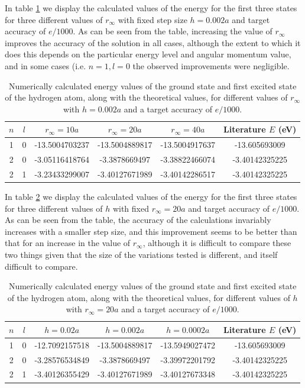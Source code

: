 \documentclass{article}
\begin{document}
In table \ref{tab:2b_ii} we display the calculated values of the energy for the first three states for three different values of $r_\infty$ with fixed step size $h=0.002a$ and target accuracy of $e/1000$. As can be seen from the table, increasing the value of $r_\infty$ improves the accuracy of the solution in all cases, although the extent to which it does this depends on the particular energy level and angular momentum value, and in some cases (i.e. $n=1, l=0$ the observed improvements were negligible.

\begin{table}[H]
	\centering
	\caption{Numerically calculated energy values of the ground state and first excited state of the hydrogen atom, along with the theoretical values, for different values of $r_\infty$ with $h=0.002a$ and a target accuracy of $e/1000$.}
	\label{tab:2b_ii}
	\begin{tabular}{c|c|c|c|c|c}
		$n$ & $l$ & $r_\infty=10a$ &  $r_\infty=20a$ & $r_\infty=40a$ & Literature $E$ (eV) \\
		\hline
		1 & 0 & -13.5004703237 & -13.5004889817 & -13.5004917637 & -13.605693009 \\
		2 & 0 & -3.05116418764 & -3.3878669497 & -3.38822466074 &  -3.40142325225 \\
		2 & 1 & -3.23433299007 & -3.40127671989 & -3.40142286517 & -3.40142325225 \\
	\end{tabular}
\end{table}

In table \ref{tab:2b_iii} we display the calculated values of the energy for the first three states for three different values of $h$ with fixed $r_\infty=20a$ and target accuracy of $e/1000$. As can be seen from the table, the accuracy of the calculations invariably increases with a smaller step size, and this improvement seems to be better than that for an increase in the value of $r_\infty$, although it is difficult to compare these two things given that the size of the variations tested is different, and itself difficult to compare. 

\begin{table}[H]
	\centering
	\caption{Numerically calculated energy values of the ground state and first excited state of the hydrogen atom, along with the theoretical values, for different values of $h$ with $r_\infty=20a$ and a target accuracy of $e/1000$.}
	\label{tab:2b_iii}
	\begin{tabular}{c|c|c|c|c|c}
		$n$ & $l$ & $h = 0.02a$ & $h = 0.002a$ & $h = 0.0002a$ & Literature $E$ (eV) \\
		\hline
		1 & 0 & -12.7092157518 & -13.5004889817 & -13.5949027472 & -13.605693009 \\
		2 & 0 & -3.28576534849 & -3.3878669497 & -3.39972201792 & -3.40142325225 \\
		2 & 1 & -3.40126355429 & -3.40127671989 & -3.40127673348 & -3.40142325225 \\
	\end{tabular}
\end{table}
\end{document}
